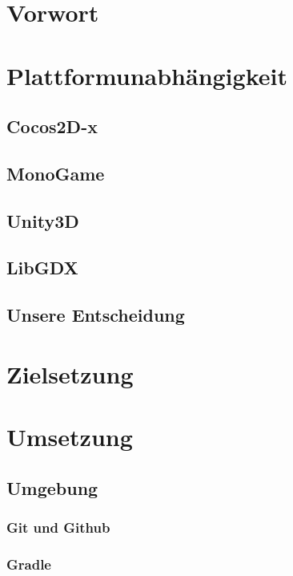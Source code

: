 \section{Vorwort}									\label{sec:V0}		\clearpage
\section{Plattformunabhängigkeit}					\label{sec:P1}		
	\subsection{Cocos2D-x}							\label{sec:P2}		
	\subsection{MonoGame}							\label{sec:P3}		
	\subsection{Unity3D}							\label{sec:P4}		
	\subsection{LibGDX}								\label{sec:P5}		
	\subsection{Unsere Entscheidung}				\label{sec:P6}		\clearpage
\section{Zielsetzung}								\label{sec:Z0}		\clearpage
\section{Umsetzung}                                 \label{sec:C0}		
	\subsection{Umgebung}                           \label{sec:U0}		
		\subsubsection{Git und Github}				\label{sec:U1}		\clearpage
		\subsubsection{Gradle}						\label{sec:U2}		\clearpage

